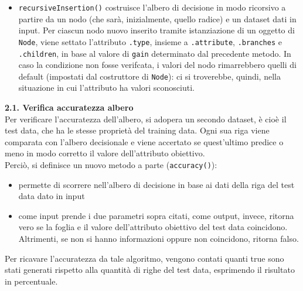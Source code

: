 \documentclass[]{article}
\begin{document}
\begin {itemize}
\begin{itemize}
                Come input prende solamente il dataset.
            \item \texttt{recursiveInsertion()} costruisce l'albero di decisione in modo ricorsivo a partire da un nodo 
                (che sarà, inizialmente, quello radice) e un dataset dati in input. Per ciascun nodo nuovo inserito 
                tramite istanziazione di un oggetto di \texttt{Node}, viene settato l'attributo \texttt{.type}, insieme a \texttt{.attribute}, \texttt{.branches} e \texttt{.children}, in base al valore di \texttt{gain} determinato dal precedente metodo.  
                In caso la condizione non fosse verifcata, i valori del nodo rimarrebbero quelli di default (impostati dal costruttore di \texttt{Node}): 
                ci si troverebbe, quindi, nella situazione in cui l'attributo ha valori sconosciuti.
        \end{itemize}
\end{itemize}        
{\large \textbf{{\Large{2}}.{\small{1}}. Verifica accuratezza albero}}\\
Per verificare l'accuratezza dell'albero, si adopera un secondo dataset, è cioè il test data, che ha le stesse proprietà del training data. 
Ogni sua riga viene comparata con l'albero decisionale e viene accertato se quest'ultimo predice o meno in modo corretto il valore dell'attributo obiettivo.\\
Perciò, si definisce un nuovo metodo a parte (\texttt{accuracy()}):
\begin{itemize}
    \item permette di scorrere nell'albero di decisione in base ai dati della riga del test data dato in input
    \item come input prende i due parametri sopra citati, come output, invece, ritorna vero se la foglia e il valore dell'attributo obiettivo del test data coincidono. 
        Altrimenti, se non si hanno informazioni oppure non coincidono, ritorna falso.
\end{itemize}
Per ricavare l'accuratezza da tale algoritmo, vengono contati quanti true sono stati generati rispetto alla quantità di righe del test data, esprimendo il risultato in percentuale.\\
\end{document}
